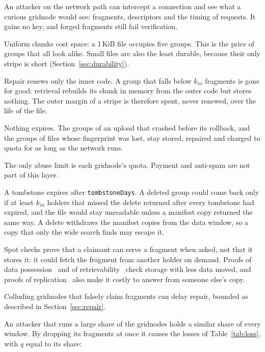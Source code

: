 \documentclass[10pt,a4paper,final]{article}
\newcommand{\code}[1]{\texttt{#1}}
\begin{document}
\begin{description}
	      An attacker on the network path can intercept a connection and see what a curious gridnode would see:
	      fragments, descriptors and the timing of requests. It gains no key, and forged fragments still fail
	      verification.
	\item[Small files] Uniform chunks cost space: a 1\,KiB file occupies five groups. This is the price of groups
	      that all look alike. Small files are also the least durable, because their only stripe is short
	      (Section~\ref{sec:durability}).
	\item[Lost groups stay lost] Repair renews only the inner code. A group that falls below $k_{in}$ fragments is
	      gone for good: retrieval rebuilds its chunk in memory from the outer code but stores nothing. The outer
	      margin of a stripe is therefore spent, never renewed, over the life of the file.
	\item[No expiry] Nothing expires. The groups of an upload that crashed before its rollback, and the groups of
	      files whose fingerprint was lost, stay stored, repaired and charged to quota for as long as the network
	      runs.
	\item[No payment] The only abuse limit is each gridnode's quota. Payment and anti-spam are not part of this
	      layer.
	\item[Resurrection] A tombstone expires after \code{tombstoneDays}. A deleted group could come back only if at
	      least $k_{in}$ holders that missed the delete returned after every tombstone had expired, and the file would
	      stay unreadable unless a manifest copy returned the same way. A delete withdraws the manifest copies from
	      the data window, so a copy that only the wide search finds may escape it.
	\item[Retrievability] Spot checks prove that a claimant can serve a fragment when asked, not that it stores it:
	      it could fetch the fragment from another holder on demand. Proofs of data possession~\cite{ateniese2007}
	      and of retrievability~\cite{juels2007} check storage with less data moved, and proofs of
	      replication~\cite{filecoin2017} also make it costly to answer from someone else's copy.
	\item[Liars] Colluding gridnodes that falsely claim fragments can delay repair, bounded as described in
	      Section~\ref{sec:repair}.
	\item[Coalitions] An attacker that runs a large share of the gridnodes holds a similar share of every window.
	      By dropping its fragments at once it causes the losses of Table~\ref{tab:loss}, with $q$ equal to its share:

\end{description}
\end{document}
